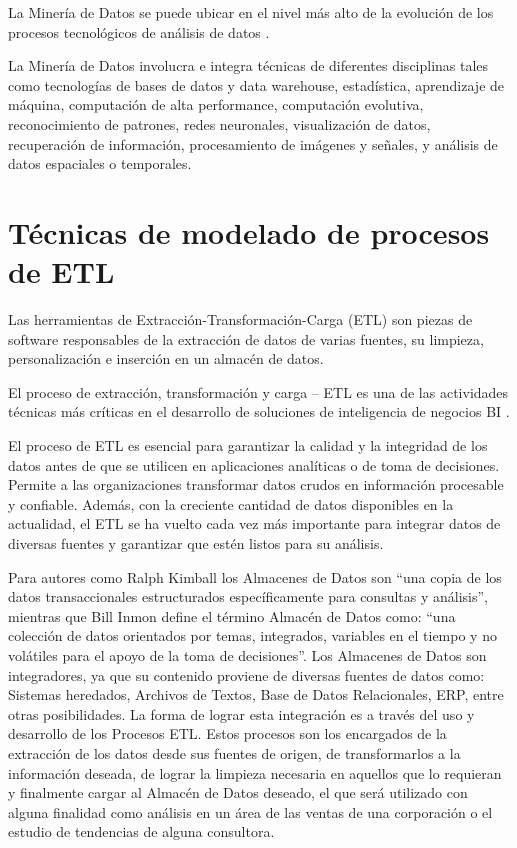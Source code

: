 La Minería de Datos se puede ubicar en el nivel más alto de la evolución de los procesos tecnológicos de análisis de datos \cite{martinez2001mineria}.

La Minería de Datos involucra e integra técnicas de diferentes disciplinas tales como tecnologías de bases de datos y data warehouse, estadística, aprendizaje de máquina, computación de alta performance, computación evolutiva, reconocimiento de patrones, redes neuronales, visualización de datos, recuperación de información, procesamiento de imágenes y señales, y análisis de datos espaciales o temporales\cite{schab2018mineria}.

\section{Técnicas de modelado de procesos de ETL}

Las herramientas de Extracción-Transformación-Carga (ETL) son piezas de software responsables de la extracción de datos de varias fuentes, su limpieza, personalización e inserción en un almacén de datos\cite{SIMITSIS200822}.

El proceso de extracción, transformación y carga – ETL es una de las actividades técnicas más críticas en el desarrollo de soluciones de inteligencia de negocios BI \cite{martinez2013tecnicas}.

El proceso de ETL es esencial para garantizar la calidad y la integridad de los datos antes de que se utilicen en aplicaciones analíticas o de toma de decisiones. Permite a las organizaciones transformar datos crudos en información procesable y confiable. Además, con la creciente cantidad de datos disponibles en la actualidad, el ETL se ha vuelto cada vez más importante para integrar datos de diversas fuentes y garantizar que estén listos para su análisis.

Para autores como Ralph Kimball los Almacenes de Datos son “una copia de los datos transaccionales estructurados específicamente para consultas y análisis”, mientras que Bill Inmon define el término Almacén de Datos como: “una colección de datos orientados por temas, integrados, variables en el tiempo y no volátiles para el apoyo de la toma de decisiones”. Los Almacenes de Datos son integradores, ya que su contenido proviene de diversas fuentes de datos como: Sistemas heredados, Archivos de Textos, Base de Datos Relacionales, ERP, entre otras posibilidades. La forma de lograr esta integración es a través del uso y desarrollo de los Procesos ETL. Estos procesos son los encargados de la extracción de los datos desde sus fuentes de origen, de transformarlos a la información deseada, de lograr la limpieza necesaria en aquellos que lo requieran y finalmente cargar al Almacén de Datos deseado, el que será utilizado con alguna finalidad como análisis en un área de las ventas de una corporación o el estudio de tendencias de alguna consultora\cite{villarroel2013incorporacion}.

